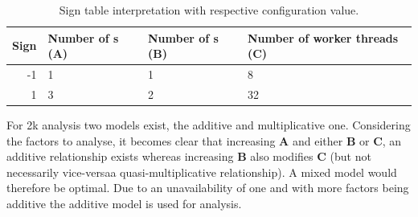    \begin{table}
        \small{
            \begin{tabular}{r l l l }
                \toprule
                Sign & Number of \srv{}s (\textbf{A}) & Number of \mw{}s (\textbf{B}) & Number of worker threads (\textbf{C})   \\
                \midrule
                -1  & 1                            & 1                           & 8   \\
                1   & 3                            & 2                           & 32  \\
                \bottomrule
            \end{tabular}
            \caption{Sign table interpretation with respective configuration value.\label{tab:6_2k-factors}}
        }
    \end{table}

    For 2k analysis two models exist, the additive and multiplicative one. Considering the factors to analyse, it
    becomes clear that increasing \textbf{A} and either \textbf{B} or \textbf{C}, an additive relationship exists
    whereas increasing \textbf{B} also modifies \textbf{C} (but not necessarily vice-versa\textemdash a
    quasi-multiplicative relationship). A mixed model would therefore be optimal. Due to an unavailability of one and
    with more factors being additive the additive model is used for analysis.

